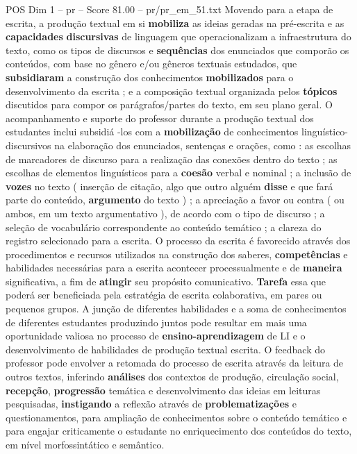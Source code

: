 \begin{textsample}{POS Dim 1 – pr – Score 81.00 – pr/pr\_em\_51.txt}
Movendo para a etapa de escrita, a produção textual em si \textbf{mobiliza} as ideias geradas na pré-escrita e as \textbf{capacidades} \textbf{discursivas} de linguagem que operacionalizam a infraestrutura do texto, como os tipos de discursos e \textbf{sequências} dos enunciados que comporão os conteúdos, com base no gênero e/ou gêneros textuais estudados, que \textbf{subsidiaram} a construção dos conhecimentos \textbf{mobilizados} para o desenvolvimento da escrita ; e a composição textual organizada pelos \textbf{tópicos} discutidos para compor os parágrafos/partes do texto, em seu plano geral.
O acompanhamento e suporte do professor durante a produção textual dos estudantes inclui subsidiá -los com a \textbf{mobilização} de conhecimentos linguístico-discursivos na elaboração dos enunciados, sentenças e orações, como : as escolhas de marcadores de discurso para a realização das conexões dentro do texto ; as escolhas de elementos linguísticos para a \textbf{coesão} verbal e nominal ; a inclusão de \textbf{vozes} no texto ( inserção de citação, algo que outro alguém \textbf{disse} e que fará parte do conteúdo, \textbf{argumento} do texto ) ; a apreciação a favor ou contra ( ou ambos, em um texto argumentativo ), de acordo com o tipo de discurso ; a seleção de vocabulário correspondente ao conteúdo temático ; a clareza do registro selecionado para a escrita.
O processo da escrita é favorecido através dos procedimentos e recursos utilizados na construção dos saberes, \textbf{competências} e habilidades necessárias para a escrita acontecer processualmente e de \textbf{maneira} significativa, a fim de \textbf{atingir} seu propósito comunicativo. \textbf{Tarefa} essa que poderá ser beneficiada pela estratégia de escrita colaborativa, em pares ou pequenos grupos.
A junção de diferentes habilidades e a soma de conhecimentos de diferentes estudantes produzindo juntos pode resultar em mais uma oportunidade valiosa no processo de \textbf{ensino-aprendizagem} de LI e o desenvolvimento de habilidades de produção textual escrita.
O feedback do professor pode envolver a retomada do processo de escrita através da leitura de outros textos, inferindo \textbf{análises} dos contextos de produção, circulação social, \textbf{recepção}, \textbf{progressão} temática e desenvolvimento das ideias em leituras pesquisadas, \textbf{instigando} a reflexão através de \textbf{problematizações} e questionamentos, para ampliação de conhecimentos sobre o conteúdo temático e para engajar criticamente o estudante no enriquecimento dos conteúdos do texto, em nível morfossintático e semântico.

\end{textsample}
